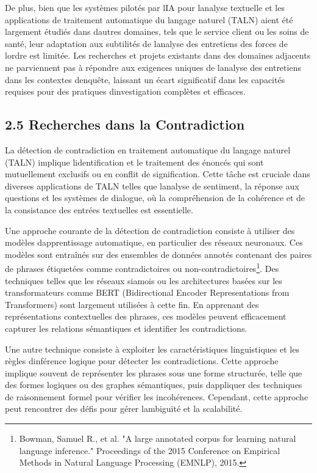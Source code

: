 \documentclass[
]{article}
\begin{document}
De plus, bien que les systèmes pilotés par l\textquotesingle IA pour
l\textquotesingle analyse textuelle et les applications de traitement
automatique du langage naturel (TALN) aient été largement étudiés dans
d\textquotesingle autres domaines, tels que le service client ou les
soins de santé, leur adaptation aux subtilités de
l\textquotesingle analyse des entretiens des forces de
l\textquotesingle ordre est limitée. Les recherches et projets existants
dans des domaines adjacents ne parviennent pas à répondre aux exigences
uniques de l\textquotesingle analyse des entretiens dans les contextes
d\textquotesingle enquête, laissant un écart significatif dans les
capacités requises pour des pratiques d\textquotesingle investigation
complètes et efficaces.

\subsection{2.5 Recherches dans la
Contradiction}\label{recherches-dans-la-contradiction}

La détection de contradiction en traitement automatique du langage
naturel (TALN) implique l\textquotesingle identification et le
traitement des énoncés qui sont mutuellement exclusifs ou en conflit de
signification. Cette tâche est cruciale dans diverses applications de
TALN telles que l\textquotesingle analyse de sentiment, la réponse aux
questions et les systèmes de dialogue, où la compréhension de la
cohérence et de la consistance des entrées textuelles est essentielle.

Une approche courante de la détection de contradiction consiste à
utiliser des modèles d\textquotesingle apprentissage automatique, en
particulier des réseaux neuronaux. Ces modèles sont entraînés sur des
ensembles de données annotés contenant des paires de phrases étiquetées
comme contradictoires ou non-contradictoires\footnote{Bowman, Samuel R.,
  et al. "A large annotated corpus for learning natural language
  inference." Proceedings of the 2015 Conference on Empirical Methods in
  Natural Language Processing (EMNLP), 2015.}. Des techniques telles que
les réseaux siamois ou les architectures basées sur les transformateurs
comme BERT (Bidirectional Encoder Representations from Transformers)
sont largement utilisées à cette fin. En apprenant des représentations
contextuelles des phrases, ces modèles peuvent efficacement capturer les
relations sémantiques et identifier les contradictions.

Une autre technique consiste à exploiter les caractéristiques
linguistiques et les règles d\textquotesingle inférence logique pour
détecter les contradictions. Cette approche implique souvent de
représenter les phrases sous une forme structurée, telle que des formes
logiques ou des graphes sémantiques, puis d\textquotesingle appliquer
des techniques de raisonnement formel pour vérifier les incohérences.
Cependant, cette approche peut rencontrer des défis pour gérer
l\textquotesingle ambiguïté et la scalabilité.
\end{document}

